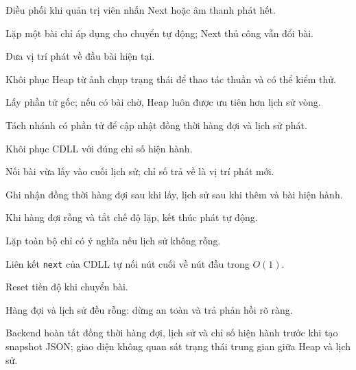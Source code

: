 \documentclass[12pt,a4paper,twoside,openright]{report}
\newcommand{\code}[1]{\texttt{#1}}
\begin{document}
\begin{description}[leftmargin=1.2cm,labelwidth=0.8cm,style=multiline,
  font=\ttfamily\bfseries,itemsep=0pt,topsep=2pt,parsep=0pt]
  \item[D1] Điều phối khi quản trị viên nhấn Next hoặc âm thanh phát hết.
  \item[D2] Lặp một bài chỉ áp dụng cho chuyển tự động; Next thủ công vẫn đổi bài.
  \item[D3] Đưa vị trí phát về đầu bài hiện tại.
  \item[D4] Khôi phục Heap từ ảnh chụp trạng thái để thao tác thuần và có thể kiểm thử.
  \item[D5] Lấy phần tử gốc; nếu có bài chờ, Heap luôn được ưu tiên hơn lịch sử vòng.
  \item[D6] Tách nhánh có phần tử để cập nhật đồng thời hàng đợi và lịch sử phát.
  \item[D7] Khôi phục CDLL với đúng chỉ số hiện hành.
  \item[D8] Nối bài vừa lấy vào cuối lịch sử; chỉ số trả về là vị trí phát mới.
  \item[D9] Ghi nhận đồng thời hàng đợi sau khi lấy, lịch sử sau khi thêm và bài hiện hành.
  \item[D10] Khi hàng đợi rỗng và tắt chế độ lặp, kết thúc phát tự động.
  \item[D11] Lặp toàn bộ chỉ có ý nghĩa nếu lịch sử không rỗng.
  \item[D12] Liên kết \code{next} của CDLL tự nối nút cuối về nút đầu trong $O(1)$.
  \item[D13] Reset tiến độ khi chuyển bài.
  \item[D14] Hàng đợi và lịch sử đều rỗng: dừng an toàn và trả phản hồi rõ ràng.
  \item[D15] Backend hoàn tất đồng thời hàng đợi, lịch sử và chỉ số hiện hành trước khi tạo
  snapshot JSON; giao diện không quan sát trạng thái trung gian giữa Heap và lịch sử.
\end{description}
\endgroup

\clearpage
\end{document}
